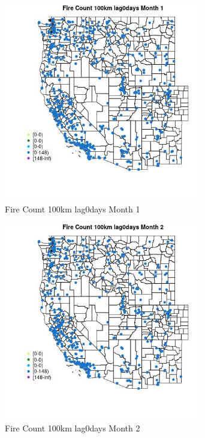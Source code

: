 \begin{figure} 
\centering  
\includegraphics[width=0.77\textwidth]{Code_Outputs/Report_ML_input_PM25_Step4_part_e_de_duplicated_aves_compiled_2019-05-18wNAs_MapObsMo1Fire_Count_100km_lag0days.jpg} 
\caption{\label{fig:Report_ML_input_PM25_Step4_part_e_de_duplicated_aves_compiled_2019-05-18wNAsMapObsMo1Fire_Count_100km_lag0days}Fire Count 100km lag0days Month 1} 
\end{figure} 
 

\begin{figure} 
\centering  
\includegraphics[width=0.77\textwidth]{Code_Outputs/Report_ML_input_PM25_Step4_part_e_de_duplicated_aves_compiled_2019-05-18wNAs_MapObsMo2Fire_Count_100km_lag0days.jpg} 
\caption{\label{fig:Report_ML_input_PM25_Step4_part_e_de_duplicated_aves_compiled_2019-05-18wNAsMapObsMo2Fire_Count_100km_lag0days}Fire Count 100km lag0days Month 2} 
\end{figure} 
 

